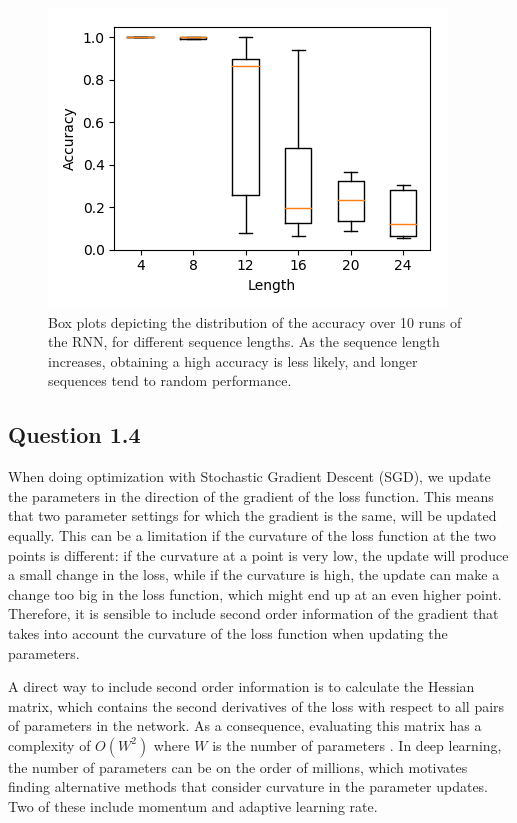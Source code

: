 \documentclass{article}
\begin{document}
\begin{figure}[t]
\centering
\includegraphics[scale=0.7]{img/rnn-acc-Lbox}
 \caption{Box plots depicting the distribution of the accuracy over 10 runs of the RNN, for different sequence lengths. As the sequence length increases, obtaining a high accuracy is less likely, and longer sequences tend to random performance.}
\label{fig:rnn_acc_box}
\end{figure}

\subsection*{Question 1.4}

When doing optimization with Stochastic Gradient Descent (SGD), we update the parameters in the direction of the gradient of the loss function. This means that two parameter settings for which the gradient is the same, will be updated equally. This can be a limitation if the curvature of the loss function at the two points is different: if the curvature at a point is very low, the update will produce a small change in the loss, while if the curvature is high, the update can make a change too big in the loss function, which might end up at an even higher point. Therefore, it is sensible to include second order information of the gradient that takes into account the curvature of the loss function when updating the parameters.

A direct way to include second order information is to calculate the Hessian matrix, which contains the second derivatives of the loss with respect to all pairs of parameters in the network. As a consequence, evaluating this matrix has a complexity of $O(W^2)$ where $W$ is the number of parameters \cite{bishop2006pattern}. In deep learning, the number of parameters can be on the order of millions, which motivates finding alternative methods that consider curvature in the parameter updates. Two of these include momentum and adaptive learning rate.
\end{document}

